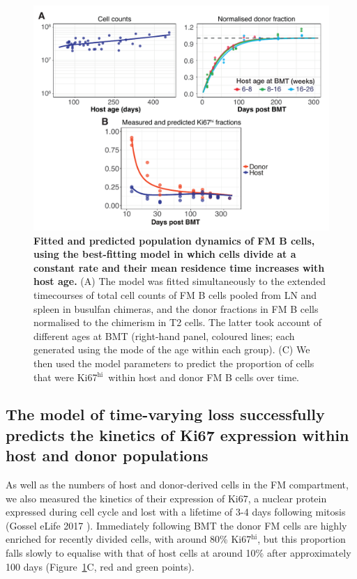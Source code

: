 \documentclass[11pt]{article}
\newcommand{\red}[1]{{\color{red}{#1}}}
\newcommand{\khi}{Ki67$^\text{hi}$}
\begin{document}
\begin{figure}[h!]
	\centerline{\includegraphics[scale = 0.85] {Results_FM.pdf}}
	\caption{\small \textbf{Fitted and predicted   population dynamics of FM B cells, using the best-fitting model in which cells divide at a constant rate and their mean residence time increases with host age.}  (A) The model was fitted simultaneously to the extended timecourses of total cell counts of FM B cells pooled from LN and spleen in busulfan chimeras,  and the donor fractions in FM B cells normalised to the chimerism in T2 cells. The latter took account of different ages at BMT (right-hand panel, coloured lines; each generated using the  mode of the age within each group). (C) We then used the model parameters to predict the proportion of cells that were \khi\ within host and donor FM B cells over time.}
	\label{fig:results_FM}
\end{figure}

\subsection*{The model of time-varying loss successfully predicts the kinetics of Ki67 expression within host and donor populations}
As well as the numbers of host and donor-derived cells in the FM compartment, we  also measured the kinetics of their expression of Ki67, a nuclear protein expressed during cell cycle and lost with a lifetime of 3-4 days following mitosis (Gossel eLife 2017 \red{and others - see refs in that paper}). Immediately following BMT the donor FM cells are highly enriched for recently divided cells, with around 80\% \khi, but this proportion falls slowly to equalise with that of host cells at around 10\% after approximately 100 days (Figure~\ref{fig:results_FM}C, red and green points).
\end{document}
